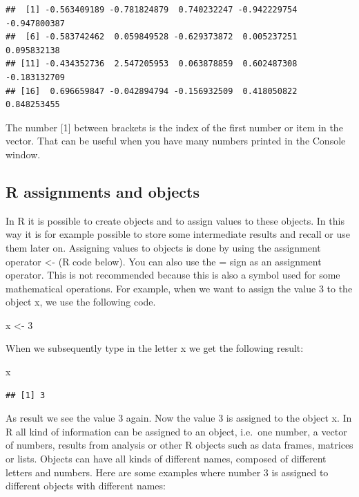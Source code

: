 \documentclass[]{book}
\newenvironment{Shaded}{\begin{snugshade}}{\end{snugshade}}
\newcommand{\DecValTok}[1]{\textcolor[rgb]{0.00,0.00,0.81}{#1}}
\newcommand{\StringTok}[1]{\textcolor[rgb]{0.31,0.60,0.02}{#1}}
\newcommand{\NormalTok}[1]{#1}
\theoremstyle{definition}
\theoremstyle{definition}
\theoremstyle{definition}
\theoremstyle{remark}
\begin{document}
\begin{verbatim}
##  [1] -0.563409189 -0.781824879  0.740232247 -0.942229754 -0.947800387
##  [6] -0.583742462  0.059849528 -0.629373872  0.005237251  0.095832138
## [11] -0.434352736  2.547205953  0.063878859  0.602487308 -0.183132709
## [16]  0.696659847 -0.042894794 -0.156932509  0.418050822  0.848253455
\end{verbatim}

The number {[}1{]} between brackets is the index of the first number or
item in the vector. That can be useful when you have many numbers
printed in the Console window.

\subsection{R assignments and objects}\label{r-assignments-and-objects}

In R it is possible to create objects and to assign values to these
objects. In this way it is for example possible to store some
intermediate results and recall or use them later on. Assigning values
to objects is done by using the assignment operator \textless{}- (R code
below). You can also use the = sign as an assignment operator. This is
not recommended because this is also a symbol used for some mathematical
operations. For example, when we want to assign the value 3 to the
object x, we use the following code.

\begin{Shaded}
\begin{Highlighting}[]
\NormalTok{x <-}\StringTok{ }\DecValTok{3} 
\end{Highlighting}
\end{Shaded}

When we subsequently type in the letter x we get the following result:

\begin{Shaded}
\begin{Highlighting}[]
\NormalTok{x }
\end{Highlighting}
\end{Shaded}

\begin{verbatim}
## [1] 3
\end{verbatim}

As result we see the value 3 again. Now the value 3 is assigned to the
object x. In R all kind of information can be assigned to an object,
i.e.~one number, a vector of numbers, results from analysis or other R
objects such as data frames, matrices or lists. Objects can have all
kinds of different names, composed of different letters and numbers.
Here are some examples where number 3 is assigned to different objects
with different names:
\end{document}
